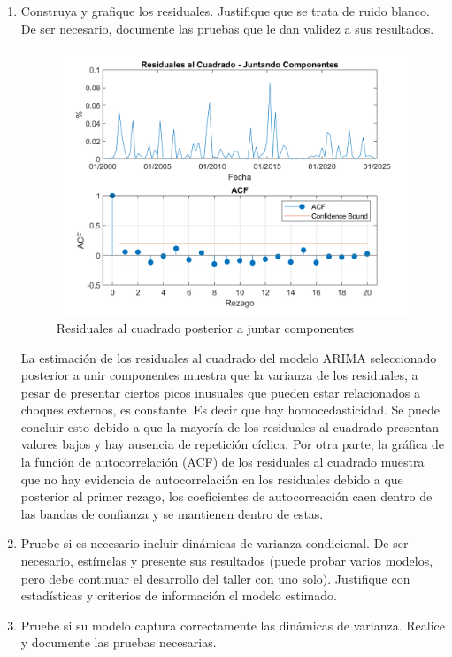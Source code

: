 \documentclass{article}
\theoremstyle{remark}
\theoremstyle{definition}
\begin{document}
\begin{enumerate}[label=\emph{\alph*})]
    \item {Construya y grafique los residuales. Justifique que se trata de ruido blanco. De ser necesario, documente las pruebas que le dan validez a sus resultados.}
        \begin{tcolorbox}[title=Soluci\'on 3.f]
            \begin{figure}[H]
                \centering
                \includegraphics[width=0.5\linewidth]{docs/ARIMA_2_0_9_residuales.png}
                \caption{Residuales al cuadrado posterior a juntar componentes}
                \label{fig:enter-label}
            \end{figure}
            La estimación de los residuales al cuadrado del modelo ARIMA seleccionado posterior a unir componentes muestra que la varianza de los residuales, a pesar de presentar ciertos picos inusuales que pueden estar relacionados a choques externos, es constante. Es decir que hay homocedasticidad. Se puede concluir esto debido a que la mayoría de los residuales al cuadrado presentan valores bajos y hay ausencia de repetición cíclica. Por otra parte, la gráfica de la función de autocorrelación (ACF) de los residuales al cuadrado muestra que no hay evidencia de autocorrelación en los residuales debido a que posterior al primer rezago, los coeficientes de autocorreación caen dentro de las bandas de confianza y se mantienen dentro de estas. 
            
        \end{tcolorbox}
        
    \item {Pruebe si es necesario incluir din\'amicas de varianza condicional. De ser necesario, est\'imelas y presente sus resultados (puede probar varios modelos, pero debe continuar el desarrollo del taller con uno solo). Justifique con estad\'isticas y criterios de informaci\'on el modelo estimado.}
        \begin{tcolorbox}[title=Soluci\'on 3.g]
            
        \end{tcolorbox}
    \item {Pruebe si su modelo captura correctamente las din\'amicas de varianza. Realice y documente las pruebas necesarias.}
        \begin{tcolorbox}[title=Soluci\'on 3.h]
            

\end{tcolorbox}
\end{enumerate}
\end{document}
